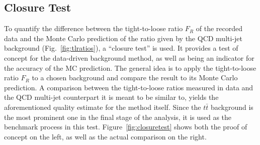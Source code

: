 \subsection{Closure Test}
\label{sec:closure-test}

To quantify the difference between the tight-to-loose ratio $F_R$ of the recorded data and the Monte Carlo prediction of the ratio given by the QCD multi-jet background (Fig.~\ref{fig:tlratios}), a ``closure test'' is used. It provides a test of concept for the data-driven background method, as well as being an indicator for the accuracy of the MC prediction. The general idea is to apply the tight-to-loose ratio $F_R$ to a chosen background and compare the result to its Monte Carlo prediction. A comparison between the tight-to-loose ratios measured in data and the QCD multi-jet counterpart it is meant to be similar to, yields the aforementioned quality estimate for the method itself. Since the $t\bar{t}$ background is the most prominent one in the final stage of the analysis, it is used as the benchmark process in this test. Figure~\ref{fig:closuretest} shows both the proof of concept on the left, as well as the actual comparison on the right.


